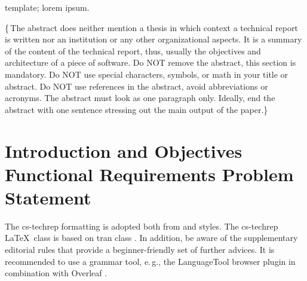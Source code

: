 \documentclass[conference,a4paper,flushend]{cs-techrep} %
\begin{document}
\selectlanguage{\cstechrepLang}

\maketitle

\begin{abstract}
This paper demonstrates an example of a technical report in computer science or software engineering, based on the \texttt{cs-techrep} LaTeX class.
The example is intended for beginners, e.\,g., undergraduate students.
It contains a basic outline template and usually fills it with dummy text, but some sections are describing the intent of the outline template and its sections.
Graphic exclamation marks highlight important remarks.
\end{abstract}

\begin{IEEEkeywords}
template; lorem ipsum.
\end{IEEEkeywords}

\{\,\faWarning{}The abstract does neither mention a thesis in which context a technical report is written nor an institution or any other organizational aspects.
It is a summary of the content of the technical report, thus, usually the objectives and architecture of a piece of software.
Do NOT remove the abstract, this section is mandatory.
Do NOT use special characters, symbols, or math in your title or abstract.
Do NOT use references in the abstract, avoid abbreviations or acronyms.
The abstract must look as one paragraph only.
Ideally, end the abstract with one sentence stressing out the main output of the paper.\}

\section{Introduction and Objectives \textbar{} Functional Requirements \textbar{} Problem Statement}

The cs-techrep formatting is adopted both from  \cite{ieee2018formattingrules} and  \cite{iaria2014formattingrules} styles.
The cs-techrep \LaTeX\ class is based on tran class \cite{ieee2015howto}.
In addition, be aware of the supplementary  editorial rules \cite{iaria2009editorialrules} \faWarning{} that provide a beginner-friendly set of further advices.
It is recommended to use a grammar tool, e.\,g., the LanguageTool \cite{languagetool} browser plugin in combination with Overleaf \cite{overleaf}.
\end{document}

